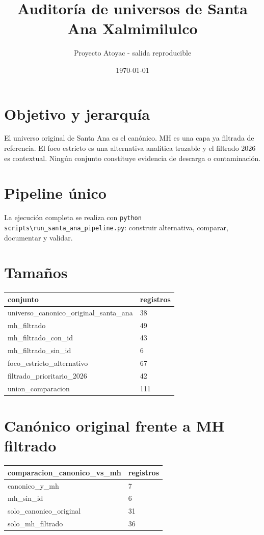 \documentclass[11pt]{article}
\title{Auditoría de universos de Santa Ana Xalmimilulco}
\author{Proyecto Atoyac - salida reproducible}
\date{\today}
\begin{document}
\maketitle

\section{Objetivo y jerarquía}

El universo original de Santa Ana es el canónico. MH es una capa ya filtrada de referencia. El foco estricto es una alternativa analítica trazable y el filtrado 2026 es contextual. Ningún conjunto constituye evidencia de descarga o contaminación.

\section{Pipeline único}

La ejecución completa se realiza con \texttt{python scripts\textbackslash run\_santa\_ana\_pipeline.py}: construir alternativa, comparar, documentar y validar.

\section{Tamaños}

\begin{tabular}{ll}
\toprule
conjunto & registros \\
\midrule
universo\_canonico\_original\_santa\_ana & 38 \\
mh\_filtrado & 49 \\
mh\_filtrado\_con\_id & 43 \\
mh\_filtrado\_sin\_id & 6 \\
foco\_estricto\_alternativo & 67 \\
filtrado\_prioritario\_2026 & 42 \\
union\_comparacion & 111 \\
\bottomrule
\end{tabular}

\section{Canónico original frente a MH filtrado}

\begin{tabular}{ll}
\toprule
comparacion\_canonico\_vs\_mh & registros \\
\midrule
canonico\_y\_mh & 7 \\
mh\_sin\_id & 6 \\
solo\_canonico\_original & 31 \\
solo\_mh\_filtrado & 36 \\
\bottomrule
\end{tabular}
\end{document}
